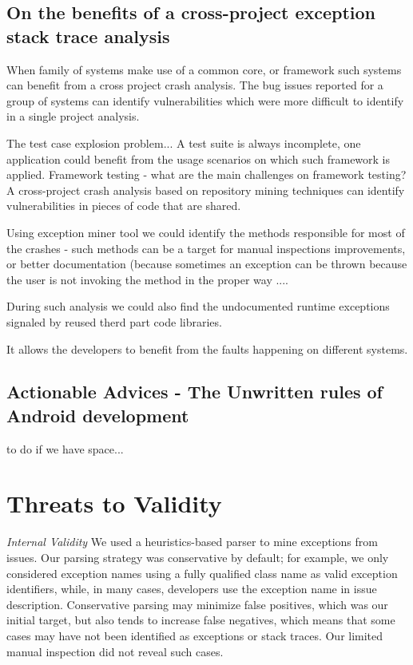 \documentclass[conference]{IEEEtran}
\begin{document}
\subsection{On the benefits of a cross-project exception stack trace analysis}  

When family of systems make use of a common core, or framework such systems can
benefit from a cross project crash analysis. The bug issues reported for a group of systems
can identify vulnerabilities which were more difficult to identify in a single project analysis.

The test case explosion problem... A test suite is always incomplete,
one application could benefit from the usage scenarios on which such framework is applied.
Framework testing -  what are the main challenges on framework testing?
A cross-project crash analysis based on repository mining techniques can 
identify vulnerabilities in pieces of code that are shared. 

Using exception miner tool we could identify the methods responsible for most of the crashes - 
such methods can be a target for manual inspections improvements, or better documentation
(because sometimes an exception can be thrown because the user is not invoking the method
in the proper way ....

During such analysis we could also find the undocumented runtime exceptions 
signaled by reused therd part code libraries. 

It allows the developers to benefit from the faults happening on different systems.

\subsection{Actionable Advices - The Unwritten rules of Android development}
to do if we have space...


\section{Threats to Validity}
\label{sec:threats}

\noindent\emph{Internal Validity} We used a heuristics-based parser to mine
exceptions from issues.  Our parsing strategy was conservative by default; for
example, we only considered exception names using a fully qualified class name
as valid exception identifiers, while, in many cases, developers use the
exception name in issue description. Conservative parsing may minimize false
positives, which was our initial target, but also tends to increase false
negatives, which means that some cases may have not been identified as
exceptions or stack traces. Our limited manual inspection did not reveal such
cases.
\end{document}
